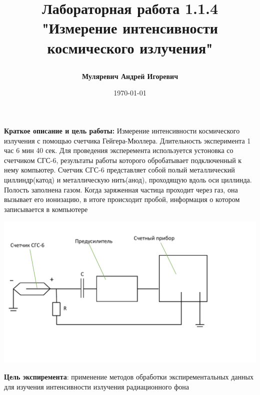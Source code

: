 \documentclass[a4paper, 12pt]{article}
\author{\textbf{Муляревич Андрей Игоревич}}
\title{
\begin{LARGE}
\textbf{Лабораторная работа 1.1.4}\\
"Измерение интенсивности космического излучения"
\end{LARGE}
}
\date{\today}
\begin{document}
\maketitle
\newpage
\textbf{Краткое описание и цель работы:} Измерение интенсивности космического излучения с помощью счетчика Гейгера-Мюллера. Длительность эксперимента 1 час 6 мин 40 сек. Для проведения эксперемента используется устоновка со счетчиком СГС-6, результаты работы которого обробатывает подключенный к нему компьютер. Счетчик СГС-6 представляет собой полый металлический циллиндр(катод) и металлическую нить(анод), проходящую вдоль оси циллинда. Полость заполнена газом. Когда заряженная частица проходит через газ, она вызывает его ионизацию, в итоге происходит пробой, информация о котором записывается в компьютере

\includegraphics[scale=0.45]{shema.pdf} 

\textbf{Цель экспиремента}: применение методов обработки экспирементальных данных для изучения интенсивности излучения радиационного фона
\end{document}

